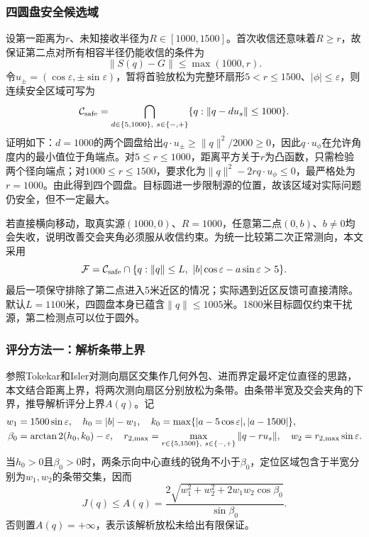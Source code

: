 \documentclass{JXUSTmodeling}
\begin{document}
\subsubsection{四圆盘安全候选域}
设第一距离为$r$、未知接收半径为$R\in[1000,1500]$。首次收信还意味着$R\ge r$，故保证第二点对所有相容半径仍能收信的条件为
\begin{equation}
 \|S(q)-G\|\le\max(1000,r).
\end{equation}
令$u_\pm=(\cos\varepsilon,\pm\sin\varepsilon)$，暂将首验放松为完整环扇形$5<r\le1500$、$|\phi|\le\varepsilon$，则连续安全区域可写为
\begin{equation}
 \mathcal C_{\rm safe}
 =\bigcap_{d\in\{5,1000\},\ s\in\{-,+\}}
 \{q:\|q-du_s\|\le1000\}.
 \label{eq:four_disks}
\end{equation}
证明如下：$d=1000$的两个圆盘给出$q\cdot u_\pm\ge\|q\|^2/2000\ge0$，因此$q\cdot u_\phi$在允许角度内的最小值位于角端点。对$5\le r\le1000$，距离平方关于$r$为凸函数，只需检验两个径向端点；对$1000\le r\le1500$，要求化为$\|q\|^2-2r q\cdot u_\phi\le0$，最严格处为$r=1000$。由此得到四个圆盘。目标圆进一步限制源的位置，故该区域对实际问题仍安全，但不一定最大。

若直接横向移动，取真实源$(1000,0)$、$R=1000$，任意第二点$(0,b)$、$b\ne0$均会失收，说明改善交会夹角必须服从收信约束。为统一比较第二次正常测向，本文采用
\begin{equation}
 \mathcal F=\mathcal C_{\rm safe}\cap
 \{q:\|q\|\le L,\ |b|\cos\varepsilon-a\sin\varepsilon>5\}.
 \label{eq:p2_feasible}
\end{equation}
最后一项保守排除了第二点进入5米近区的情况；实际遇到近区反馈可直接清除。默认$L=1100$米，四圆盘本身已蕴含$\|q\|\le1005$米。1800米目标圆仅约束干扰源，第二检测点可以位于圆外。

\subsubsection{评分方法一：解析条带上界}
参照Tokekar和Isler对测向扇区交集作几何外包、进而界定最坏定位直径的思路\cite{tokekar}，本文结合距离上界，将两次测向扇区分别放松为条带。由条带半宽及交会夹角的下界，推导解析评分上界$A(q)$。记
\begin{align}
 w_1&=1500\sin\varepsilon,\quad h_0=|b|-w_1,\quad
 k_0=\max\{|a-5\cos\varepsilon|,|a-1500|\},\notag\\
 \beta_0&=\arctan2(h_0,k_0)-\varepsilon,\quad
 r_{2,\max}=\max_{r\in\{5,1500\},\ s\in\{-,+\}}\|q-r u_s\|,
 \quad w_2=r_{2,\max}\sin\varepsilon.
\end{align}
当$h_0>0$且$\beta_0>0$时，两条示向中心直线的锐角不小于$\beta_0$，定位区域包含于半宽分别为$w_1,w_2$的条带交集，因而
\begin{equation}
 J(q)\le A(q)=
 \frac{2\sqrt{w_1^2+w_2^2+2w_1w_2\cos\beta_0}}{\sin\beta_0}.
 \label{eq:analytic_bound}
\end{equation}
否则置$A(q)=+\infty$，表示该解析放松未给出有限保证。
\end{document}
